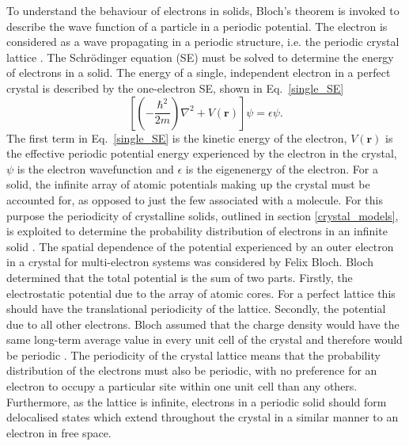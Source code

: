 \documentclass[11pt, twoside]{report}
\begin{document}
To understand the behaviour of electrons in solids, Bloch's theorem is invoked to describe the wave function of a particle in a periodic potential. The electron is considered as a wave propagating in a periodic structure, i.e. the periodic crystal lattice \cite{small_semiconductor1}. The Schr{\"o}dinger equation (SE) must be solved to determine the energy of electrons in a solid. 
The energy of a single, independent electron in a perfect crystal is described by the one-electron SE, shown in Eq.~\ref{single_SE}
\begin{equation} \label{single_SE}
\left[ \left(-\frac{\hbar^2}{2m}\right)\nabla^2 + V(\boldsymbol{r})\right]\psi = \epsilon \psi .
\end{equation}
The first term in Eq.~\ref{single_SE} is the kinetic energy of the electron, $V(\boldsymbol{r})$ is the effective periodic potential energy experienced by the electron in the crystal, $\psi$ is the electron wavefunction and $\epsilon$ is the eigenenergy of the electron.
For a solid, the infinite array of atomic potentials making up the crystal must be accounted for, as opposed to just the few associated with a molecule. For this purpose the periodicity of crystalline solids, outlined in section \ref{crystal_models}, is exploited to determine the probability distribution of electrons in an infinite solid \cite{Nelson3}. 
The spatial dependence of the potential experienced by an outer electron in a crystal for multi-electron systems was considered by Felix Bloch. Bloch determined that the total potential is the sum of two parts. Firstly, the electrostatic potential due to the array of atomic cores. For a perfect lattice this should have the translational periodicity of the lattice. Secondly, the potential due to all other electrons. Bloch assumed that the charge density would have the same long-term average value in every unit cell of the crystal and therefore would be periodic \cite{fund_semi}.
The periodicity of the crystal lattice means that the probability distribution of the electrons must also be periodic, with no preference for an electron to occupy a particular site within one unit cell than any others. Furthermore, as the lattice is infinite, electrons in a periodic solid should form delocalised states which extend throughout the crystal in a similar manner to an electron in free space.

\end{document}
